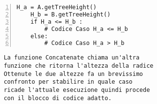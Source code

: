 \begin{minipage}{0.49\linewidth}
	\begin{Verbatim}[frame=topline,numbers=left,label=Codice,framesep=3mm]
	H_a = A.getTreeHeight()
	H_b = B.getTreeHeight()
	if H_a <= H_b :
		# Codice Caso H_a <= H_b
	else:
		# Codice Caso H_a > H_b
	\end{Verbatim}
\end{minipage}\hfill
\begin{minipage}{0.49\linewidth}
	\begin{Verbatim}
	La funzione Concatenate chiama un'altra 
	funzione che ritorna l'altezza della radice
	Ottenute le due altezze fa un brevissimo
	confronto per stabilire in quale caso 
	ricade l'attuale esecuzione quindi procede
	con il blocco di codice adatto.
	\end{Verbatim}

\end{minipage}
\newline \newline